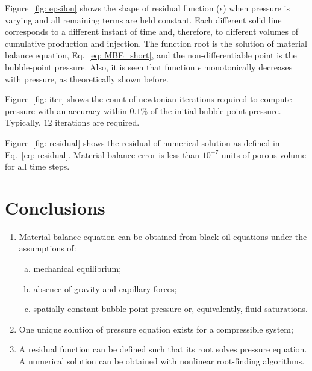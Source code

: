 \documentclass[authoryear,preprint,review,11pt]{elsarticle}
\begin{document}
Figure~\ref{fig: epsilon} shows the shape of residual function ($\epsilon$) when pressure is varying and all remaining terms are held constant. Each different solid line corresponds to a different instant of time and, therefore, to different volumes of cumulative production and injection. The function root is the solution of material balance equation, Eq.~\eqref{eq: MBE_short}, and the non-differentiable point is the bubble-point pressure. Also, it is seen that function $\epsilon$ monotonically decreases with pressure, as theoretically shown before.

Figure~\ref{fig: iter} shows the count of newtonian iterations required to compute pressure with an accuracy within $0.1\%$ of the initial bubble-point pressure. Typically, $12$ iterations are required.

Figure~\ref{fig: residual} shows the residual of numerical solution as defined in Eq.~\eqref{eq: residual}. Material balance error is less than $10^{-7}$ units of porous volume for all time steps.



\section{Conclusions}
\begin{enumerate}[1.]
\item Material balance equation can be obtained from black-oil equations under the assumptions of:
\begin{enumerate}[(a)]
\item mechanical equilibrium;
\item absence of gravity and capillary forces;
\item spatially constant bubble-point pressure or, equivalently, fluid saturations.
\end{enumerate}
\item One unique solution of pressure equation exists for a compressible system;
\item A residual function can be defined such that its root solves pressure equation. A numerical solution can be obtained with nonlinear root-finding algorithms.
\end{enumerate}
\end{document}
